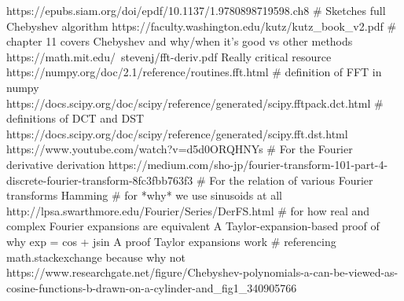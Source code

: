 https://epubs.siam.org/doi/epdf/10.1137/1.9780898719598.ch8 # Sketches full Chebyshev algorithm
https://faculty.washington.edu/kutz/kutz_book_v2.pdf # chapter 11 covers Chebyshev and why/when it's good vs other methods
https://math.mit.edu/~stevenj/fft-deriv.pdf Really critical resource
https://numpy.org/doc/2.1/reference/routines.fft.html # definition of FFT in numpy
https://docs.scipy.org/doc/scipy/reference/generated/scipy.fftpack.dct.html # definitions of DCT and DST
https://docs.scipy.org/doc/scipy/reference/generated/scipy.fft.dst.html
https://www.youtube.com/watch?v=d5d0ORQHNYs # For the Fourier derivative derivation
https://medium.com/sho-jp/fourier-transform-101-part-4-discrete-fourier-transform-8fc3fbb763f3 # For the relation of various Fourier transforms
Hamming  # for *why* we use sinusoids at all
http://lpsa.swarthmore.edu/Fourier/Series/DerFS.html # for how real and complex Fourier expansions are equivalent
A Taylor-expansion-based proof of why exp = cos + jsin
A proof Taylor expansions work # referencing math.stackexchange because why not
https://www.researchgate.net/figure/Chebyshev-polynomials-a-can-be-viewed-as-cosine-functions-b-drawn-on-a-cylinder-and_fig1_340905766